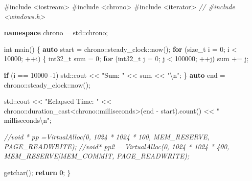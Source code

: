 \documentclass[
]{article}
\newenvironment{Shaded}{}{}
\newcommand{\BuiltInTok}[1]{#1}
\newcommand{\CommentTok}[1]{\textcolor[rgb]{0.38,0.63,0.69}{\textit{#1}}}
\newcommand{\ControlFlowTok}[1]{\textcolor[rgb]{0.00,0.44,0.13}{\textbf{#1}}}
\newcommand{\DataTypeTok}[1]{\textcolor[rgb]{0.56,0.13,0.00}{#1}}
\newcommand{\DecValTok}[1]{\textcolor[rgb]{0.25,0.63,0.44}{#1}}
\newcommand{\ImportTok}[1]{#1}
\newcommand{\KeywordTok}[1]{\textcolor[rgb]{0.00,0.44,0.13}{\textbf{#1}}}
\newcommand{\NormalTok}[1]{#1}
\newcommand{\OperatorTok}[1]{\textcolor[rgb]{0.40,0.40,0.40}{#1}}
\newcommand{\PreprocessorTok}[1]{\textcolor[rgb]{0.74,0.48,0.00}{#1}}
\newcommand{\SpecialCharTok}[1]{\textcolor[rgb]{0.25,0.44,0.63}{#1}}
\newcommand{\StringTok}[1]{\textcolor[rgb]{0.25,0.44,0.63}{#1}}
\begin{document}
\begin{Shaded}
\begin{Highlighting}[]
\PreprocessorTok{\#include }\ImportTok{\textless{}iostream\textgreater{}}
\PreprocessorTok{\#include }\ImportTok{\textless{}chrono\textgreater{}}
\PreprocessorTok{\#include }\ImportTok{\textless{}iterator\textgreater{}}
\CommentTok{// \#include \textless{}windows.h\textgreater{}}

\KeywordTok{namespace}\NormalTok{ chrono }\OperatorTok{=} \BuiltInTok{std::}\NormalTok{chrono}\OperatorTok{;}

\DataTypeTok{int}\NormalTok{ main}\OperatorTok{()}
\OperatorTok{\{}
    \KeywordTok{auto}\NormalTok{ start }\OperatorTok{=}\NormalTok{ chrono}\OperatorTok{::}\NormalTok{steady\_clock}\OperatorTok{::}\NormalTok{now}\OperatorTok{();}
    \ControlFlowTok{for} \OperatorTok{(}\DataTypeTok{size\_t}\NormalTok{ i }\OperatorTok{=} \DecValTok{0}\OperatorTok{;}\NormalTok{ i }\OperatorTok{\textless{}} \DecValTok{10000}\OperatorTok{;} \OperatorTok{++}\NormalTok{i}\OperatorTok{)}
    \OperatorTok{\{}       
        \DataTypeTok{int32\_t}\NormalTok{ sum }\OperatorTok{=} \DecValTok{0}\OperatorTok{;}
        \ControlFlowTok{for} \OperatorTok{(}\DataTypeTok{int32\_t}\NormalTok{ j }\OperatorTok{=} \DecValTok{0}\OperatorTok{;}\NormalTok{ j }\OperatorTok{\textless{}} \DecValTok{100000}\OperatorTok{;} \OperatorTok{++}\NormalTok{j}\OperatorTok{)}
\NormalTok{            sum }\OperatorTok{+=}\NormalTok{ j}\OperatorTok{;}

        \ControlFlowTok{if} \OperatorTok{(}\NormalTok{i }\OperatorTok{==} \DecValTok{10000} \OperatorTok{{-}}\DecValTok{1}\OperatorTok{)}
            \BuiltInTok{std::}\NormalTok{cout}\OperatorTok{ \textless{}\textless{}} \StringTok{"Sum: "} \OperatorTok{\textless{}\textless{}}\NormalTok{ sum }\OperatorTok{\textless{}\textless{}} \StringTok{"}\SpecialCharTok{\textbackslash{}n}\StringTok{"}\OperatorTok{;}
    \OperatorTok{\}}
    \KeywordTok{auto}\NormalTok{ end }\OperatorTok{=}\NormalTok{ chrono}\OperatorTok{::}\NormalTok{steady\_clock}\OperatorTok{::}\NormalTok{now}\OperatorTok{();}

    \BuiltInTok{std::}\NormalTok{cout}\OperatorTok{ \textless{}\textless{}} \StringTok{"Eclapsed Time: "} \OperatorTok{\textless{}\textless{}}\NormalTok{ chrono}\OperatorTok{::}\NormalTok{duration\_cast}\OperatorTok{\textless{}}\NormalTok{chrono}\OperatorTok{::}\NormalTok{milliseconds}\OperatorTok{\textgreater{}(}\NormalTok{end }\OperatorTok{{-}}\NormalTok{ start}\OperatorTok{).}\NormalTok{count}\OperatorTok{()} \OperatorTok{\textless{}\textless{}} \StringTok{" milliseconds}\SpecialCharTok{\textbackslash{}n}\StringTok{"}\OperatorTok{;}
    
    \CommentTok{//void * pp =VirtualAlloc(0, 1024 * 1024 * 100, MEM\_RESERVE, PAGE\_READWRITE);}
    \CommentTok{//void* pp2 = VirtualAlloc(0, 1024 * 1024 * 400, MEM\_RESERVE|MEM\_COMMIT, PAGE\_READWRITE);}

\NormalTok{    getchar}\OperatorTok{();}
    \ControlFlowTok{return} \DecValTok{0}\OperatorTok{;}
\OperatorTok{\}}
\end{Highlighting}
\end{Shaded}
\end{document}
